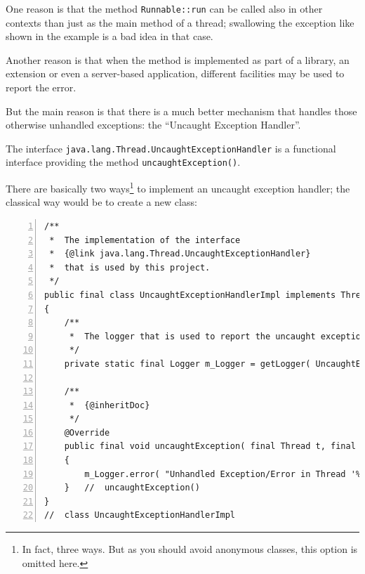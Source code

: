 \documentclass[11pt,a4paper, titlepage, parskip=half, headsepline, footsepline, cleardoublepage=current, headheight=1cm]{scrbook}
\begin{document}
One reason is that the method \lstinline|Runnable::run|\autocite{ORACLE_DOC_RUNNABLE:run} can be called also in other contexts than just as the main method of a thread; swallowing the exception like shown in the example is a bad idea in that case.

Another reason is that when the method is implemented as part of a library, an extension or even a server-based application, different facilities may be used to report the error.

But the main reason is that there is a much better mechanism that handles those otherwise unhandled exceptions: the “Uncaught Exception Handler”\autocite{ORACLE_DOC_UNCAUGHTEXCEPTIONHANDLER_INTERFACE}.

The interface \lstinline|java.lang.Thread.UncaughtExceptionHandler| is a functional interface\autocite{ORACLE_DOC_LANGUAGE_SPECIFICATION:FunctionalInterfaces, ORACLE_DOC_LANGUAGE_SPECIFICATION:FunctionalInterface, ORACLE_DOC_FUNCTIONALINTERFACE_ANNOTATION} providing the method \lstinline|uncaughtException()|\autocite{ORACLE_DOC_UNCAUGHTEXCEPTIONHANDLER:uncaughtException}.

There are basically two ways\footnote{In fact, three ways. But as you should avoid anonymous classes, this option is omitted here.} to implement an uncaught exception handler; the classical way would be to create a new class:
\begin{lstlisting}[numbers=left,caption={Class UncaughtExceptionHandlerImpl}]
/**
 *  The implementation of the interface
 *  {@link java.lang.Thread.UncaughtExceptionHandler}
 *  that is used by this project.
 */
public final class UncaughtExceptionHandlerImpl implements Thread.UncaughtExceptionHandler
{
    /**
     *  The logger that is used to report the uncaught exceptions.
     */
    private static final Logger m_Logger = getLogger( UncaughtExceptionHandlerImpl.class );
     
    /**
     *  {@inheritDoc}
     */
    @Override
    public final void uncaughtException( final Thread t, final Throwable e )
    {
        m_Logger.error( "Unhandled Exception/Error in Thread '%s'".formatted( t.getName(), e );
    }   //  uncaughtException()
}
//  class UncaughtExceptionHandlerImpl 
\end{lstlisting}
\end{document}
